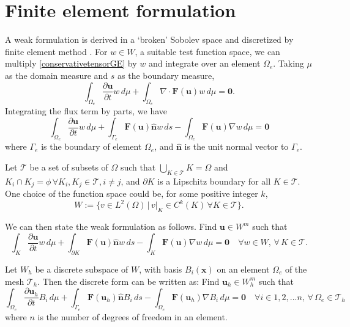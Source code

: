 \documentclass[11pt]{article}
\let\bld\boldsymbol
\begin{document}
\section{Finite element formulation}

A weak formulation is derived in a `broken' Sobolev space and discretized by finite element method \cite{luo_taylor}. For $w \in W$, a suitable test function space, we can multiply \eqref{conservativetensorGE} by $w$ and integrate over an element $\Omega_e$. Taking $\mu$ as the domain measure and $s$ as the boundary measure,
\begin{equation}
\int_{\Omega_e} \frac{\partial\bld{u}}{\partial t}w\,d\mu + \int_{\Omega_e}\nabla\cdot\bld{F(\bld{u})}w \,d\mu = \bld{0}.
\end{equation}
Integrating the flux term by parts, we have
\begin{equation}
\int_{\Omega_e} \frac{\partial\bld{u}}{\partial t}w\,d\mu + \int_{\Gamma_e} \bld{F}(\bld{u})\hat{\bld{n}}w \,ds - \int_{\Omega_e}\bld{F}(\bld{u})\nabla w \,d\mu = \bld{0}
\end{equation}
where $\Gamma_e$ is the boundary of element $\Omega_e$, and $\hat{\bld{n}}$ is the unit normal vector to $\Gamma_e$.

Let $\mathcal{T}$ be a set of subsets of $\Omega$ such that $\bigcup_{K\in \mathcal{T}}K = \Omega$ and $K_i \cap K_j = \phi \, \forall K_i, K_j \in \mathcal{T}, i \neq j$, and $\partial K$ is a Lipschitz boundary for all $K \in \mathcal{T}$. One choice of the function space could be, for some positive integer $k$,
\begin{equation}
W := \{ v \in L^2(\Omega)\, |\, v|_{K} \in C^k(K) \,\forall K \in \mathcal{T} \}.
\end{equation}

We can then state the weak formulation as follows. Find $\bld{u} \in W^m$ such that
\begin{equation}
\int_{K} \frac{\partial\bld{u}}{\partial t}w\,d\mu + \int_{\partial K} \bld{F}(\bld{u})\hat{\bld{n}}w \,ds - \int_{K}\bld{F}(\bld{u})\nabla w \,d\mu = \bld{0} \quad \forall w \in W,\, \forall \,K \in \mathcal{T}.
\label{wf}
\end{equation}

Let $W_h$ be a discrete subspace of $W$, with basis $B_i(\bld{x})$ on an element $\Omega_e$ of the mesh $\mathcal{T}_h$. Then the discrete form can be written as: Find $\bld{u}_h \in W_h^m$ such that
\begin{equation}
\int_{\Omega_e} \frac{\partial\bld{u}_h}{\partial t}B_i\,d\mu + \int_{\Gamma_e} \bld{F}(\bld{u}_h)\hat{\bld{n}}B_i \,ds - \int_{\Omega_e}\bld{F}(\bld{u}_h)\nabla B_i \,d\mu = \bld{0} \quad \forall i \in {1,2,...n},\, \forall \,\Omega_e \in \mathcal{T}_h
\end{equation}
where $n$ is the number of degrees of freedom in an element. 
\end{document}
